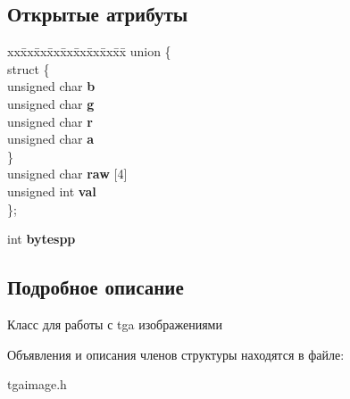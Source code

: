 \subsection*{Открытые атрибуты}
\begin{DoxyCompactItemize}
\item 
\mbox{\label{structTGAColor_a2eedaf6edded502bf6adaa278790e2d2}} 
\begin{tabbing}
xx\=xx\=xx\=xx\=xx\=xx\=xx\=xx\=xx\=\kill
union \{\\
\mbox{\label{unionTGAColor_1_1_0D0_a035005d6d13ca7adf94c6d011a5a610e}} 
\>struct \{\\
\>\>unsigned char {\bfseries b}\\
\>\>unsigned char {\bfseries g}\\
\>\>unsigned char {\bfseries r}\\
\>\>unsigned char {\bfseries a}\\
\>\} \\
\>unsigned char {\bfseries raw} \mbox{[}4\mbox{]}\\
\>unsigned int {\bfseries val}\\
\}; \\

\end{tabbing}\item 
\mbox{\label{structTGAColor_ae3bccd51cd08eeadd1c0bac739d3e47d}} 
int {\bfseries bytespp}
\end{DoxyCompactItemize}


\subsection{Подробное описание}
Класс для работы с tga изображениями 

Объявления и описания членов структуры находятся в файле\+:\begin{DoxyCompactItemize}
\item 
tgaimage.\+h\end{DoxyCompactItemize}
